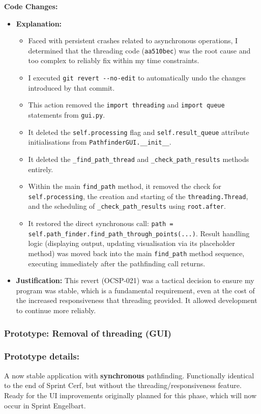 	\textbf{Code Changes:}
	\begin{itemize}
		\item \textbf{Explanation:}
		\begin{itemize}
			\item Faced with persistent crashes related to asynchronous operations, I determined that the threading code (\verb|aa510bec|) was the root cause and too complex to reliably fix within my time constraints.
			\item I executed \verb|git revert --no-edit| to automatically undo the changes introduced by that commit.
			\item This action removed the \verb|import threading| and \verb|import queue| statements from \verb|gui.py|.
			\item It deleted the \verb|self.processing| flag and \verb|self.result_queue| attribute initialisations from \verb|PathfinderGUI.__init__|.
			\item It deleted the \verb|_find_path_thread| and \verb|_check_path_results| methods entirely.
			\item Within the main \verb|find_path| method, it removed the check for \verb|self.processing|, the creation and starting of the \verb|threading.Thread|, and the scheduling of \verb|_check_path_results| using \verb|root.after|.
			\item It restored the direct synchronous call: \verb|path = self.path_finder.find_path_through_points(...)|. Result handling logic (displaying output, updating visualisation via its placeholder method) was moved back into the main \verb|find_path| method sequence, executing immediately after the pathfinding call returns.
		\end{itemize}
		\item \textbf{Justification:} This revert (OCSP-021) was a tactical decision to ensure my program was stable, which is a fundamental requirement, even at the cost of the increased responsiveness that threading provided. It allowed development to continue more reliably.
	\end{itemize}
	

\newpage
\subsubsection*{Prototype: Removal of threading (GUI)}



\newpage

\subsubsection{Prototype details:}
A now stable application with \textbf{synchronous} pathfinding. Functionally identical to the end of Sprint Cerf, but without the threading/responsiveness feature. Ready for the UI improvements originally planned for this phase, which will now occur in Sprint Engelbart.

